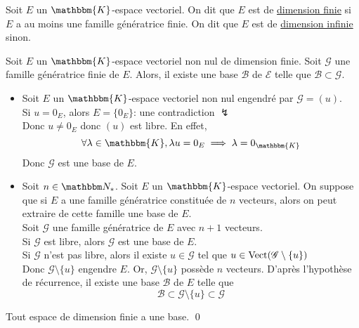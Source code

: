 \begin{defn}
	Soit $E$ un $\mathbbm{K}$-espace vectoriel. On dit que $E$ est de \underline{dimension finie} si $E$ a au moins une famille génératrice finie. On dit que $E$ est de \underline{dimension infinie} sinon.
\end{defn}

\begin{thm}
	Soit $E$ un $\mathbbm{K}$-espace vectoriel non nul de dimension finie. Soit $\mathcal{G}$ une famille génératrice finie de $E$. Alors, il existe une base $\mathcal{B}$ de $\mathcal{E}$ telle que $\mathcal{B} \subset \mathcal{G}$.
\end{thm}

\begin{prv}
	[par récurrence sur $\#G = \Card(G)$]
	\begin{itemize}
		\item Soit $E$ un $\mathbbm{K}$-espace vectoriel non nul engendré par $\mathcal{G} = (u)$.\\
			Si $u = 0_E$, alors $E = \{0_E\}$: une contradiction $\lightning$ \\
			Donc $u \neq 0_E$ donc $(u)$ est libre. En effet, \[
				\forall \lambda \in \mathbbm{K}, \lambda u = 0_E \implies \lambda = 0_\mathbbm{K}
			\] Donc $\mathcal{G}$ est une base de $E$.\\
		\item Soit $n \in \N_*$. Soit $E$ un $\mathbbm{K}$-espace vectoriel. On suppose que si $E$ a une famille génératrice constituée de $n$ vecteurs, alors on peut extraire de cette famille une base de $E$.\\
			Soit $\mathcal{G}$ une famille génératrice de $E$ avec $n+1$ vecteurs.\\
			Si $\mathcal{G}$ est libre, alors $\mathcal{G}$ est une base de $E$. \\
			Si $\mathcal{G}$ n'est pas libre, alors il existe $u \in \mathcal{G}$ tel que $u \in \operatorname{Vect}(\mathcal{G}\setminus \{u\})$ \\
			Donc $\mathcal{G}\setminus \{u\}$ engendre $E$. Or, $\mathcal{G}\setminus \{u\}$ possède $n$ vecteurs. D'après l'hypothèse de récurrence, il existe une base $\mathcal{B}$ de $E$ telle que \[
				\mathcal{B} \subset \mathcal{G} \setminus \{u\} \subset \mathcal{G}
			\] 
	\end{itemize}
\end{prv}

\begin{crlr}
	Tout espace de dimension finie a une base.
	\qed
\end{crlr}


